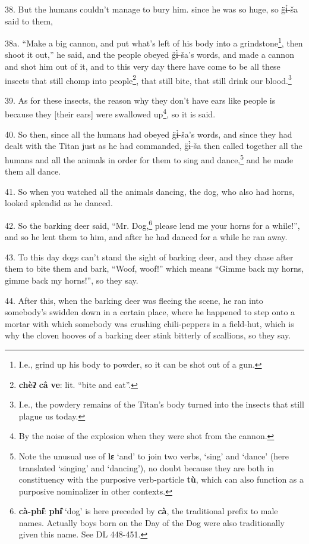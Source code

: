 38. But the humans couldn't manage to bury him. since he was so huge, so g̈ɨ̀-ša
said to them,

38a. ``Make a big cannon, and put what's left of his body into a grindstone\footnote{I.e., grind up his body to powder, so it can be shot out of a gun.},
then shoot it out,'' he said, and the people obeyed g̈ɨ̀-ša's words, and made
a cannon and shot him out of it, and to this very day there have come to be all
these insects that still chomp into people\footnote{\textbf{chèʔ} \textbf{câ} \textbf{ve}: lit. ``bite and eat''.}, that still bite, that still drink
our blood.\footnote{I.e., the powdery remains of the Titan's body turned into the insects that still plague us today.}

39. As for these insects, the reason why they don't have ears like people is because
they [their ears] were swallowed up\footnote{By the noise of the explosion when they were shot from the cannon.}, so it is said.

40. So then, since all the humans had obeyed g̈ɨ̀-ša's words, and since they
had dealt with the Titan just as he had commanded, g̈ɨ̀-ša then called together
all the humans and all the animals in order for them to sing and dance,\footnote{Note the unusual use of \textbf{lɛ} `and' to join two verbs, `sing' and `dance' (here translated `singing' and `dancing'), no doubt because they are both in constituency with the purposive verb-particle \textbf{tù}, which can also function as a purposive nominalizer in other contexts.} and
he made them all dance.

41. So when you watched all the animals dancing, the dog, who also had horns, looked
splendid as he danced.

42. So the barking deer said, ``Mr. Dog,\footnote{\textbf{cà-phɨ̂}: \textbf{phɨ̂} `dog' is here preceded by \textbf{cà}, the traditional prefix to male names. Actually boys born on the Day of the Dog were also traditionally given this name. See DL 448-451.} please lend me your horns for a while!'',
and so he lent them to him, and after he had danced for a while he ran away.

43. To this day dogs can't stand the sight of barking deer, and they chase after
them to bite them and bark, ``Woof, woof!'' which means ``Gimme back my horns,
gimme back my horns!'', so they say.

44. After this, when the barking deer was fleeing the scene, he ran into somebody's
swidden down in a certain place, where he happened to step onto a mortar with which
somebody was crushing chili-peppers in a field-hut, which is why the cloven hooves
of a barking deer stink bitterly of scallions, so they say.

